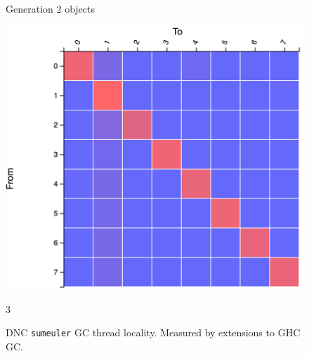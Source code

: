 \documentclass{paper}\usepackage{graphicx}
\begin{document}
\begin{figure}[!htb]
\begin{multicols}{3}
    \caption{Generation 2 objects}
    \label{fig:dnc_gen2}
    \includegraphics[width=\linewidth]{Paper/images/sumeuler/divconq_gen2.png}\par
    \end{multicols}{3}
    \caption{DNC \lstinline{sumeuler} GC thread locality. Measured by extensions to GHC GC.}
    \label{fig:dnc_static}
\end{figure}
\end{document}
